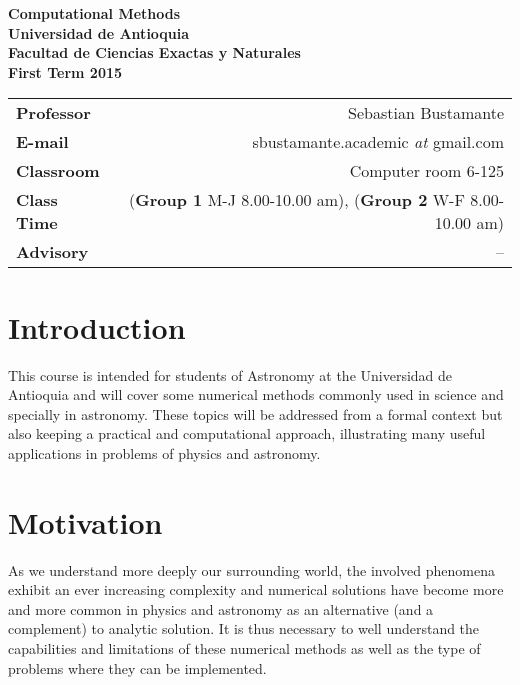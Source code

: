 \documentclass[a4,useAMS,usenatbib,usegraphicx,12pt]{article}
\begin{document}
\begin{flushleft}
  \sffamily\bfseries
  {\Large Computational Methods}\LOGO\\
  Universidad de Antioquia\\
  Facultad de Ciencias Exactas y Naturales\\
  First Term 2015
\end{flushleft}

\hrulefill\par

\vspace{1cm}
\begin{tabular}{L!{\VRule}R}
\bf Professor		& Sebastian Bustamante\\
\bf E-mail		& sbustamante.academic \textit{at} gmail.com\\
\bf Classroom		& Computer room 6-125\\
\bf Class Time		& (\textbf{Group 1} M-J 8.00-10.00 am), (\textbf{Group 2} W-F 8.00-10.00 am) \\
\bf Advisory		& --
\end{tabular}


\section*{Introduction}

This course is intended for students of Astronomy at the Universidad de Antioquia 
and will cover some numerical methods commonly used in science and specially in 
astronomy. These topics will be addressed from a formal context but also keeping 
a practical and computational approach, illustrating many useful applications in
problems of physics and astronomy.

\section*{Motivation}

As we understand more deeply our surrounding world, the involved phenomena
exhibit an ever increasing complexity and numerical solutions have become 
more and more common in physics and astronomy as an alternative (and a complement) 
to analytic solution. It is thus necessary to well understand the capabilities 
and limitations of these numerical methods as well as the type
of problems where they can be implemented.
\end{document}
